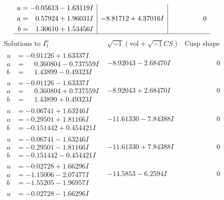 \documentclass[1p]{elsarticle_modified}
\theoremstyle{definition}
\newcommand{\I}{\sqrt{-1}}
\begin{document}
$$\begin{array}{c|c|c}
\begin{aligned}
u &= -0.05613 - 1.63119 I \\
a &= \phantom{-}0.57924 + 1.96031 I \\
b &= \phantom{-}1.30610 + 1.53456 I\end{aligned}
 & -8.81712 + 4.37016 I & \phantom{-0.000000 } 0\\
 \hline 
 \end{array}$$\newpage$$\begin{array}{c|c|c}  
\text{Solutions to }I^u_{1}& \I (\text{vol} + \sqrt{-1}CS) & \text{Cusp shape}\\
 \hline 
\begin{aligned}
u &= -0.01126 + 1.63337 I \\
a &= \phantom{-}0.360804 - 0.737559 I \\
b &= \phantom{-}1.43899 - 0.49323 I\end{aligned}
 & -8.92043 - 2.68470 I & \phantom{-0.000000 } 0 \\ \hline\begin{aligned}
u &= -0.01126 - 1.63337 I \\
a &= \phantom{-}0.360804 + 0.737559 I \\
b &= \phantom{-}1.43899 + 0.49323 I\end{aligned}
 & -8.92043 + 2.68470 I & \phantom{-0.000000 } 0 \\ \hline\begin{aligned}
u &= -0.06741 + 1.63246 I \\
a &= -0.29501 + 1.81166 I \\
b &= -0.151442 + 0.454421 I\end{aligned}
 & -11.61330 - 7.84388 I & \phantom{-0.000000 } 0 \\ \hline\begin{aligned}
u &= -0.06741 - 1.63246 I \\
a &= -0.29501 - 1.81166 I \\
b &= -0.151442 - 0.454421 I\end{aligned}
 & -11.61330 + 7.84388 I & \phantom{-0.000000 } 0 \\ \hline\begin{aligned}
u &= -0.02728 + 1.66296 I \\
a &= -1.15006 - 2.07477 I \\
b &= -1.55205 - 1.96957 I\end{aligned}
 & -14.5853 - 6.2594 I & \phantom{-0.000000 } 0 \\ \hline\begin{aligned}
u &= -0.02728 - 1.66296 I \\

\end{aligned}
\end{array}$$
\end{document}
